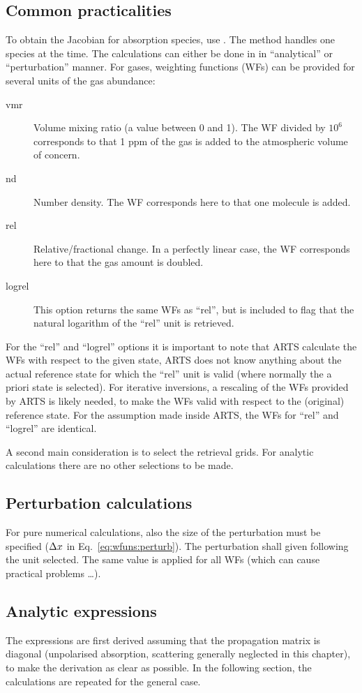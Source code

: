 \subsection{Common practicalities}
%
To obtain the Jacobian for absorption species, use
. The method handles one species at the time.
The calculations can either be done in in ``analytical'' or ``perturbation''
manner. For gases, weighting functions (WFs) can be provided for several units
of the gas abundance:
\begin{description}
\item[vmr] Volume mixing ratio (a value between 0 and 1). The WF divided by
  $10^6$ corresponds to that 1 ppm of the gas is added to the atmospheric
  volume of concern.
\item[nd] Number density. The WF corresponds here to that one molecule is added.
\item[rel] Relative/fractional change. In a perfectly linear case, the WF
  corresponds here to that the gas amount is doubled.
\item[logrel] This option returns the same WFs as ``rel'', but is included to
  flag that the natural logarithm of the ``rel'' unit is retrieved.
\end{description}
For the ``rel'' and ``logrel'' options it is important to note that ARTS
calculate the WFs with respect to the given state, ARTS does not know anything
about the actual reference state for which the ``rel'' unit is valid (where
normally the a priori state is selected). For iterative inversions, a rescaling
of the WFs provided by ARTS is likely needed, to make the WFs valid with
respect to the (original) reference state. For the assumption made inside ARTS,
the WFs for ``rel'' and ``logrel'' are identical.

A second main consideration is to select the retrieval grids. For analytic
calculations there are no other selections to be made. 


\subsection{Perturbation calculations}
%
For pure numerical calculations, also the size of the perturbation must be
specified ($\Delta x$ in Eq.~\ref{eq:wfuns:perturb}). The perturbation
shall given following the unit selected. The same value is applied for all WFs
(which can cause practical problems \dots).


\subsection{Analytic expressions}
%
The expressions are first derived assuming that the propagation matrix is
diagonal (unpolarised absorption, scattering generally neglected in this
chapter), to make the derivation as clear as possible. In the following
section, the calculations are repeated for the general case.

